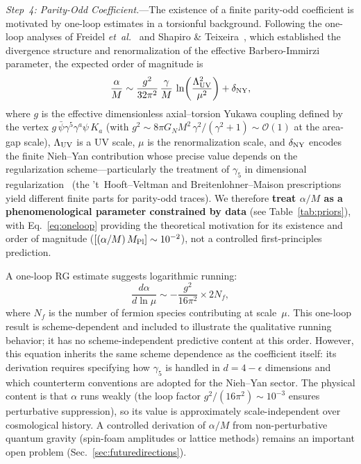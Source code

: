\documentclass[aps,prd,twocolumn,superscriptaddress,showpacs,preprintnumbers,nofootinbib,longbibliography,floatfix]{revtex4-2}
\newcommand{\MPl}{M_{\rm Pl}}
\newcommand{\etal}{\textit{et~al.}}
\begin{document}
\textit{Step~4: Parity-Odd Coefficient.}---The existence of a finite parity-odd coefficient is motivated by one-loop estimates in a torsionful background. Following the one-loop analyses of Freidel \etal~\cite{Freidel2005} and Shapiro \& Teixeira~\cite{ShapiroTeixeira2014}, which established the divergence structure and renormalization of the effective Barbero-Immirzi parameter, the expected order of magnitude is
\begin{equation}\label{eq:oneloop}
\frac{\alpha}{M}\sim \frac{g^2}{32\pi^2}\,\frac{\gamma}{M}\,\ln\!\left(\frac{\Lambda_{\rm UV}^2}{\mu^2}\right)+\delta_{\rm NY},
\end{equation}
where $g$ is the effective dimensionless axial--torsion Yukawa coupling defined by the vertex $g\,\bar{\psi}\gamma^5\gamma^a\psi\,K_a$ (with $g^2\sim 8\pi G_N M^2\,\gamma^2/(\gamma^2+1)\sim\mathcal{O}(1)$ at the area-gap scale), $\Lambda_{\rm UV}$ is a UV scale, $\mu$ is the renormalization scale, and $\delta_{\rm NY}$ encodes the finite Nieh--Yan contribution whose precise value depends on the regularization scheme---particularly the treatment of $\gamma_5$ in dimensional regularization~\cite{ShapiroTeixeira2014} (the 't~Hooft--Veltman and Breitenlohner--Maison prescriptions yield different finite parts for parity-odd traces). We therefore \textbf{treat $\alpha/M$ as a phenomenological parameter constrained by data} (see Table~\ref{tab:priors}), with Eq.~\eqref{eq:oneloop} providing the theoretical motivation for its existence and order of magnitude ($[(\alpha/M)\,\MPl]\sim 10^{-2}$), not a controlled first-principles prediction.

A one-loop RG estimate suggests logarithmic running:
\begin{equation}\label{eq:RGflow}
\frac{d\alpha}{d\ln\mu} \sim -\frac{g^2}{16\pi^2}\times 2N_f,
\end{equation}
where $N_f$ is the number of fermion species contributing at scale~$\mu$. This one-loop result is scheme-dependent and included to illustrate the qualitative running behavior; it has no scheme-independent predictive content at this order. However, this equation inherits the same scheme dependence as the coefficient itself: its derivation requires specifying how $\gamma_5$ is handled in $d=4-\epsilon$ dimensions and which counterterm conventions are adopted for the Nieh--Yan sector. The physical content is that $\alpha$ runs weakly (the loop factor $g^2/(16\pi^2)\sim 10^{-3}$ ensures perturbative suppression), so its value is approximately scale-independent over cosmological history. A controlled derivation of $\alpha/M$ from non-perturbative quantum gravity (spin-foam amplitudes or lattice methods) remains an important open problem (Sec.~\ref{sec:futuredirections}).
\end{document}
